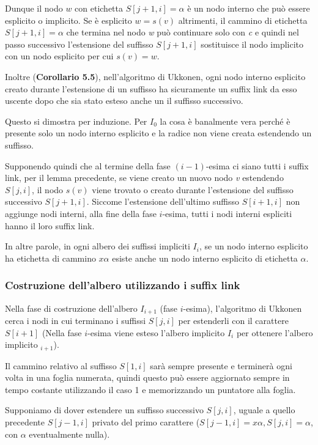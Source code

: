 Dunque il nodo $ w $ con etichetta $ S[j+1, i]  = \alpha$ è un nodo interno che può essere esplicito o implicito. Se è esplicito $w = s(v)$ altrimenti, il cammino di etichetta $ S[j+1, i] = \alpha $ che termina nel nodo \textit{w} può continuare solo con \textit{c} e quindi nel passo successivo l'estensione del suffisso $ S[j+1,i] $ sostituisce il nodo implicito con un nodo esplicito per cui $s(v) = w$.

Inoltre (\textbf{Corollario 5.5}), nell'algoritmo di Ukkonen, ogni nodo interno esplicito creato durante l'estensione di un suffisso ha sicuramente un suffix link da esso uscente dopo che sia stato esteso anche un il suffisso successivo.

Questo si dimostra per induzione. Per $ I_0 $ la cosa è banalmente vera perché è presente solo un nodo interno esplicito e la radice non viene creata estendendo un suffisso.

Supponendo quindi che al termine della fase $(i-1)$-esima ci siano tutti i suffix link, per il lemma precedente, se viene creato un nuovo nodo \textit{v} estendendo $ S[j,i] $, il nodo $ s(v) $ viene trovato o creato durante l'estensione del suffisso successivo $ S[j+1,i] $. Siccome l'estensione dell'ultimo suffisso $ S[i+1,i] $ non aggiunge nodi interni, alla fine della fase $ i $-esima, tutti i nodi interni espliciti hanno il loro suffix link.

In altre parole, in ogni albero dei suffissi impliciti $ I_i $, se un nodo interno esplicito ha etichetta di cammino $ x\alpha $ esiste anche un nodo interno esplicito di etichetta $\alpha$.

\subsubsection{Costruzione dell'albero utilizzando i suffix link}

Nella fase di costruzione dell'albero $ I_{i+1} $ (fase $ i $-esima), l'algoritmo di Ukkonen cerca i nodi in cui terminano i suffissi $ S[j,i] $ per estenderli con il carattere $ S[i+1] $ (Nella fase $i$-esima viene esteso l'albero implicito $I_i$ per ottenere l'albero implicito $_{i+1}$).

Il cammino relativo al suffisso $ S[1,i] $ sarà sempre presente e terminerà ogni volta in una foglia numerata, quindi questo può essere aggiornato sempre in tempo costante utilizzando il caso 1 e memorizzando un puntatore alla foglia.

Supponiamo di dover estendere un suffisso successivo $ S[j,i] $, uguale a quello precedente $ S[j-1,i] $ privato del primo carattere ($S[j-1,i] = x\alpha, S[j,i]= \alpha$, con $\alpha$ eventualmente nulla).

